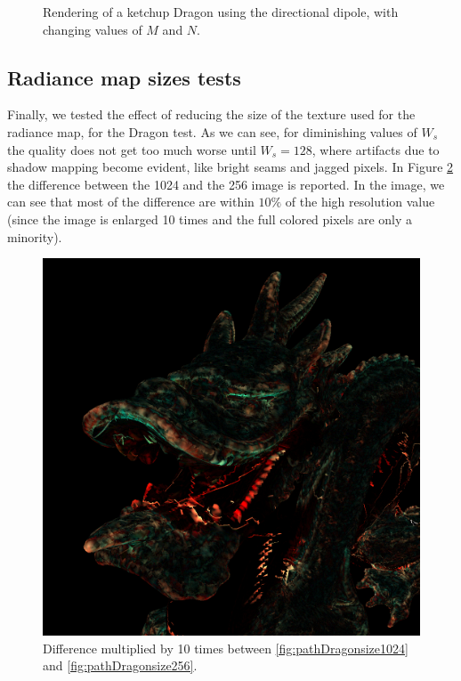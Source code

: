 \begin{figure}
{}
\label{fig:pathDragon}
\caption{Rendering of a ketchup Dragon using the directional dipole, with changing values of $M$ and $N$. }
\end{figure}

\clearpage
\subsection{Radiance map sizes tests}
Finally, we tested the effect of reducing the size of the texture used for the radiance map, for the Dragon test. As we can see, for diminishing values of $W_s$ the quality does not get too much worse until $W_s = 128$, where artifacts due to shadow mapping become evident, like bright seams and jagged pixels. In Figure \ref{fig:pathDragonsizett} the difference between the 1024 and the 256 image is reported. In the image, we can see that most of the difference are within $10\%$ of the high resolution value (since the image is enlarged 10 times and the full colored pixels are only a minority).

\begin{figure}[!h]
\centering
  \includegraphics[width=0.7 \linewidth]{images/results/difference.png}
\caption{Difference multiplied by 10 times between \ref{fig:pathDragonsize1024} and \ref{fig:pathDragonsize256}.}
\label{fig:pathDragonsizett}
\end{figure}

